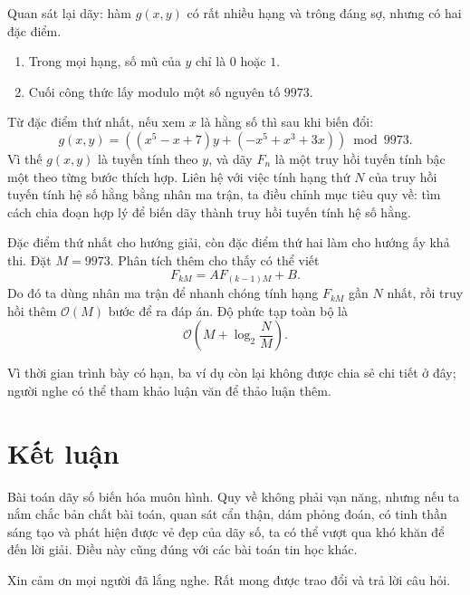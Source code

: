 \documentclass[11pt]{article}
\newcommand{\Oh}{\mathcal{O}}
\begin{document}
Quan sát lại dãy: hàm \(g(x,y)\) có rất nhiều hạng và trông đáng sợ, nhưng
có hai đặc điểm.
\begin{enumerate}
  \item Trong mọi hạng, số mũ của \(y\) chỉ là \(0\) hoặc \(1\).
  \item Cuối công thức lấy modulo một số nguyên tố \(9973\).
\end{enumerate}

Từ đặc điểm thứ nhất, nếu xem \(x\) là hằng số thì sau khi biến đổi:
\[
  g(x,y)=((x^5-x+7)y+(-x^5+x^3+3x)) \bmod 9973.
\]
Vì thế \(g(x,y)\) là tuyến tính theo \(y\), và dãy \(F_n\) là một truy hồi
tuyến tính bậc một theo từng bước thích hợp. Liên hệ với việc tính hạng thứ
\(N\) của truy hồi tuyến tính hệ số hằng bằng nhân ma trận, ta điều chỉnh mục
tiêu quy về: tìm cách chia đoạn hợp lý để biến dãy thành truy hồi tuyến tính
hệ số hằng.

Đặc điểm thứ nhất cho hướng giải, còn đặc điểm thứ hai làm cho hướng ấy khả
thi. Đặt \(M=9973\). Phân tích thêm cho thấy có thể viết
\[
  F_{kM}=A F_{(k-1)M}+B.
\]
Do đó ta dùng nhân ma trận để nhanh chóng tính hạng \(F_{kM}\) gần \(N\)
nhất, rồi truy hồi thêm \(\Oh(M)\) bước để ra đáp án. Độ phức tạp toàn bộ là
\[
  \Oh\!\left(M+\log_2\frac{N}{M}\right).
\]

Vì thời gian trình bày có hạn, ba ví dụ còn lại không được chia sẻ chi tiết
ở đây; người nghe có thể tham khảo luận văn để thảo luận thêm.

\section{Kết luận}

Bài toán dãy số biến hóa muôn hình. Quy về không phải vạn năng, nhưng nếu ta
nắm chắc bản chất bài toán, quan sát cẩn thận, dám phỏng đoán, có tinh thần
sáng tạo và phát hiện được vẻ đẹp của dãy số, ta có thể vượt qua khó khăn để
đến lời giải. Điều này cũng đúng với các bài toán tin học khác.

Xin cảm ơn mọi người đã lắng nghe. Rất mong được trao đổi và trả lời câu hỏi.
\end{document}
